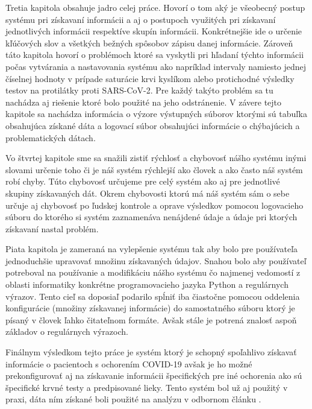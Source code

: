 Tretia kapitola obsahuje jadro celej práce. Hovorí o tom aký je všeobecný postup systému pri získavaní informácii a aj o postupoch využitých pri získavaní jednotlivých informácii respektíve skupín informácii. Konkrétnejšie ide o určenie kľúčových slov a všetkých bežných spôsobov zápisu danej informácie. Zároveň táto kapitola hovorí o problémoch ktoré sa vyskytli pri hľadaní týchto informácii počas vytvárania a nastavovania systému ako napríklad intervaly namiesto jednej číselnej hodnoty v prípade saturácie krvi kyslíkom alebo protichodné výsledky testov na protilátky proti SARS-CoV-2. Pre každý takýto problém sa tu nachádza aj riešenie ktoré bolo použité na jeho odstránenie. V závere tejto kapitole sa nachádza informácia o výzore výstupných súborov ktorými sú tabuľka obsahujúca získané dáta a logovací súbor obsahujúci informácie o chýbajúcich a problematických dátach. 

Vo štvrtej kapitole sme sa snažili zistiť rýchlosť a  chybovosť nášho systému inými slovami určenie toho či je náš systém rýchlejší ako človek a ako často náš systém robí chyby. Túto chybovosť určujeme pre celý systém ako aj pre jednotlivé skupiny získavaných dát. Okrem chybovosti ktorú má náš systém sám o sebe určuje aj chybovosť po ľudskej kontrole a oprave výsledkov pomocou logovacieho súboru do ktorého si systém zaznamenáva nenájdené údaje a údaje pri ktorých získavaní nastal problém.

Piata kapitola je zameraná na vylepšenie systému tak aby bolo pre používateľa jednoduchšie upravovať množinu získavaných údajov. Snahou bolo aby používateľ potreboval na používanie a modifikáciu nášho systému čo najmenej vedomostí z oblasti informatiky konkrétne programovacieho jazyka Python a regulárnych výrazov. Tento cieľ sa doposiaľ podarilo spĺniť iba čiastočne pomocou oddelenia konfigurácie (množiny získavanej informácie) do samostatného súboru ktorý je písaný v človek ľahko čitateľnom formáte. Avšak stále je potrená znalosť aspoň základov o regulárnych výrazoch.

Finálnym výsledkom tejto práce je systém ktorý je schopný spoľahlivo získavať informácie o pacientoch s ochorením COVID-19 avšak je ho možné prekonfigurovať aj na získavanie informácii špecifických pre iné ochorenia ako sú špecifické krvné testy a predpisované lieky. Tento systém bol už aj použitý v praxi, dáta ním získané boli použité na analýzu v odbornom článku \cite{sabaka}. 